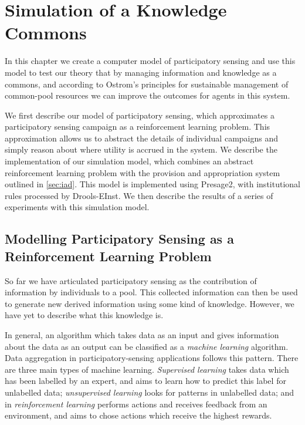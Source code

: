 \acresetall
\chapter{Simulation of a Knowledge Commons}

In this chapter we create a computer model of participatory sensing and use
this model to test our theory that by managing information and knowledge as a
commons, and according to Ostrom's principles for sustainable management of
common-pool resources we can improve the outcomes for agents in this system.

We first describe our model of participatory sensing, which approximates a
participatory sensing campaign as a reinforcement learning problem. This
approximation allows us to abstract the details of individual campaigns and
simply reason about where utility is accrued in the system.  We describe the
implementation of our simulation model, which combines an abstract
reinforcement learning problem with the provision and appropriation system
outlined in \autoref{sec:iad}. This model is implemented using Presage2, with
institutional rules processed by Drools-EInst. We then describe the results of
a series of experiments with this simulation model.

\section{Modelling Participatory Sensing as a Reinforcement Learning Problem}

So far we have articulated participatory sensing as the contribution of
information by individuals to a pool. This collected information can then be
used to generate new derived information using some kind of knowledge.
However, we have yet to describe what this knowledge is.

In general, an algorithm which takes data as an input and gives information
about the data as an output can be classified as a \emph{machine learning}
algorithm. Data aggregation in participatory-sensing applications follows this
pattern. There are three main types of machine learning. \emph{Supervised
learning} takes data which has been labelled by an expert, and aims to learn
how to predict this label for unlabelled data; \emph{unsupervised learning}
looks for patterns in unlabelled data; and in \emph{reinforcement learning}
performs actions and receives feedback from an environment, and aims to chose
actions which receive the highest rewards.

